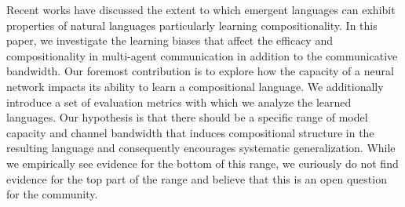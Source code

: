 Recent works have discussed the extent to which emergent languages can exhibit properties of natural languages particularly learning compositionality. In this paper, we investigate the learning biases that affect the efficacy and compositionality in multi-agent communication in addition to the communicative bandwidth. Our foremost contribution is to explore how the capacity of a neural network impacts its ability to learn a compositional language. We additionally introduce a set of evaluation metrics with which we analyze the learned languages. Our hypothesis is that there should be a specific range of model capacity and channel bandwidth that induces compositional structure in the resulting language and consequently encourages systematic generalization. While we empirically see evidence for the bottom of this range, we curiously do not find evidence for the top part of the range and believe that this is an open question for the community.
